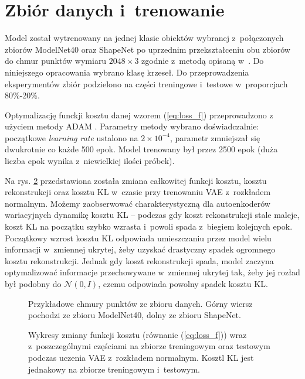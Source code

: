 \documentclass{iithesis}
\begin{document}
\section{Zbiór danych i~trenowanie} \label{sec:training_process}
Model został wytrenowany na jednej klasie obiektów wybranej z~połączonych zbiorów ModelNet40 \cite{modelnet}
oraz ShapeNet \cite{shapenet} po uprzednim przekształceniu obu zbiorów do
chmur punktów wymiaru $2048 \times 3$ zgodnie z~metodą opisaną w~\cite{pc_representations}.
Do niniejszego opracowania wybrano klasę krzeseł.
Do przeprowadzenia eksperymentów zbiór podzielono na części treningowe i~testowe w~proporcjach 80\%-20\%.

Optymalizację funckji kosztu danej wzorem (\ref{eq:loss_f}) przeprowadzono z
użyciem metody ADAM \cite{adam}.
Parametry metody wybrano doświadczalnie: początkowe \textit{learning rate} ustalono na $2 \times 10^{-4}$,
parametr zmniejszał się dwukrotnie co każde 500 epok.
Model trenowany był przez 2500 epok (duża liczba epok wynika z~niewielkiej ilości próbek).

Na rys. \ref{fig:loss_decrease} przedstawiona została zmiana całkowitej funkcji kosztu,
kosztu rekonstrukcji oraz kosztu KL w~czasie przy trenowaniu VAE z~rozkładem normalnym.
Możemy zaobserwować charakterystyczną dla autoenkoderów
wariacyjnych dynamikę kosztu KL -- podczas gdy koszt rekonstrukcji stale maleje, koszt KL na początku
szybko wzrasta i~powoli spada z~biegiem kolejnych epok. Początkowy wzrost kosztu KL odpowiada umieszczaniu
przez model wielu informacji w~zmiennej ukrytej,
żeby uzyskać drastyczny spadek ogromnego kosztu rekonstrukcji. Jednak gdy koszt rekonstrukcji spada,
model zaczyna optymalizować informacje przechowywane w~zmiennej ukrytej
tak, żeby jej rozład był podobny do $\mathcal{N}(0, I)$, czemu odpowiada powolny spadek kosztu KL.

\begin{figure}
    \caption{\label{fig:data_samples} Przykładowe chmury punktów ze zbioru danych.
    Górny wiersz pochodzi ze zbioru ModelNet40, dolny ze zbioru ShapeNet. }
\end{figure}

\begin{figure}

    \vspace*{\floatsep }

    \caption{\label{fig:loss_decrease} Wykresy zmiany funkcji kosztu (równanie (\ref{eq:loss_f}))
    wraz z~poszczególnymi częściami na zbiorze treningowym oraz testowym podczas
    uczenia VAE z~rozkładem normalnym. Kosztl KL jest jednakowy na zbiorze treningowym i~testowym.}
\end{figure}
\end{document}

